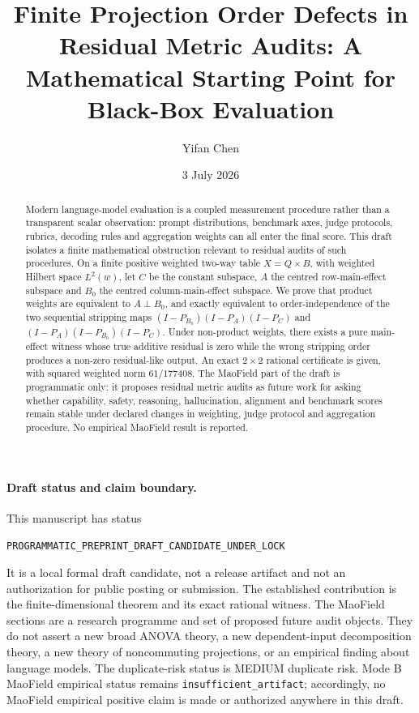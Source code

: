 \documentclass[11pt]{article}
\title{Finite Projection Order Defects in Residual Metric Audits: A Mathematical Starting Point for Black-Box Evaluation}
\author{Yifan Chen}
\affil{MaoField research programme}
\date{3 July 2026}
\theoremstyle{remark}
\begin{document}
\maketitle

\begin{abstract}
Modern language-model evaluation is a coupled measurement procedure rather than a transparent scalar observation: prompt distributions, benchmark axes, judge protocols, rubrics, decoding rules and aggregation weights can all enter the final score. This draft isolates a finite mathematical obstruction relevant to residual audits of such procedures. On a finite positive weighted two-way table $X=Q\times B$, with weighted Hilbert space $L^2(w)$, let $C$ be the constant subspace, $A$ the centred row-main-effect subspace and $B_0$ the centred column-main-effect subspace. We prove that product weights are equivalent to $A\perp B_0$, and exactly equivalent to order-independence of the two sequential stripping maps $(I-P_{B_0})(I-P_A)(I-P_C)$ and $(I-P_A)(I-P_{B_0})(I-P_C)$. Under non-product weights, there exists a pure main-effect witness whose true additive residual is zero while the wrong stripping order produces a non-zero residual-like output. An exact $2\times2$ rational certificate is given, with squared weighted norm $61/177408$. The MaoField part of the draft is programmatic only: it proposes residual metric audits as future work for asking whether capability, safety, reasoning, hallucination, alignment and benchmark scores remain stable under declared changes in weighting, judge protocol and aggregation procedure. No empirical MaoField result is reported.
\end{abstract}

\paragraph{Draft status and claim boundary.}
This manuscript has status\par\begin{center}\small\texttt{PROGRAMMATIC\_PREPRINT\_DRAFT\_CANDIDATE\_UNDER\_LOCK}\end{center}It is a local formal draft candidate, not a release artifact and not an authorization for public posting or submission. The established contribution is the finite-dimensional theorem and its exact rational witness. The MaoField sections are a research programme and set of proposed future audit objects. They do not assert a new broad ANOVA theory, a new dependent-input decomposition theory, a new theory of noncommuting projections, or an empirical finding about language models. The duplicate-risk status is MEDIUM duplicate risk. Mode B MaoField empirical status remains \texttt{insufficient\_artifact}; accordingly, no MaoField empirical positive claim is made or authorized anywhere in this draft.
\end{document}
